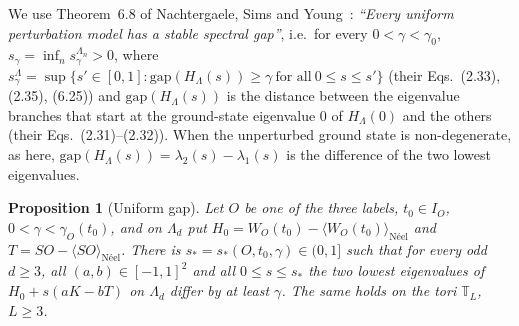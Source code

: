 \documentclass[aps,prx,onecolumn,10pt,nofootinbib,longbibliography,floatfix]{revtex4-2}
\newtheorem{proposition}{Proposition}
\theoremstyle{remark}
\begin{document}
We use Theorem~6.8 of Nachtergaele, Sims and Young~\cite{nsy2022}: \emph{``Every uniform perturbation model has a %
stable spectral gap''}, i.e.\ for every $0<\gamma<\gamma_0$, $s_\gamma=\inf_n s^{\Lambda_n}_\gamma>0$, where
$s^{\Lambda}_\gamma=\sup\{s'\in[0,1]:\mathrm{gap}(H_\Lambda(s))\ge\gamma\ \text{for all}\ 0\le s\le s'\}$ (their
Eqs.~(2.33), (2.35), (6.25)) and $\mathrm{gap}(H_\Lambda(s))$ is the distance between the eigenvalue branches that %
start at the ground-state eigenvalue $0$ of $H_\Lambda(0)$ and the others (their Eqs.~(2.31)--(2.32)). When the %
unperturbed ground state is non-degenerate, as here, $\mathrm{gap}(H_\Lambda(s))=\lambda_2(s)-\lambda_1(s)$ is the
difference of the two lowest eigenvalues.

\begin{proposition}[Uniform gap]
\label{prop:stab}
Let $O$ be one of the three labels, $t_0\in I_O$, $0<\gamma<\gamma_O(t_0)$, and on $\Lambda_d$ put
$H_0=W_O(t_0)-\langle W_O(t_0)\rangle_{\text{N\'eel}}$ and $T=SO-\langle SO\rangle_{\text{N\'eel}}$. There is
$s_*=s_*(O,t_0,\gamma)\in(0,1]$ such that for every odd $d\ge3$, all $(a,b)\in[-1,1]^2$ and all $0\le s\le s_*$ the two
lowest eigenvalues of $H_0+s(aK-bT)$ on $\Lambda_d$ differ by at least $\gamma$. The same holds on the tori
$\mathbb T_L$, $L\ge3$.
\end{proposition}
\end{document}
